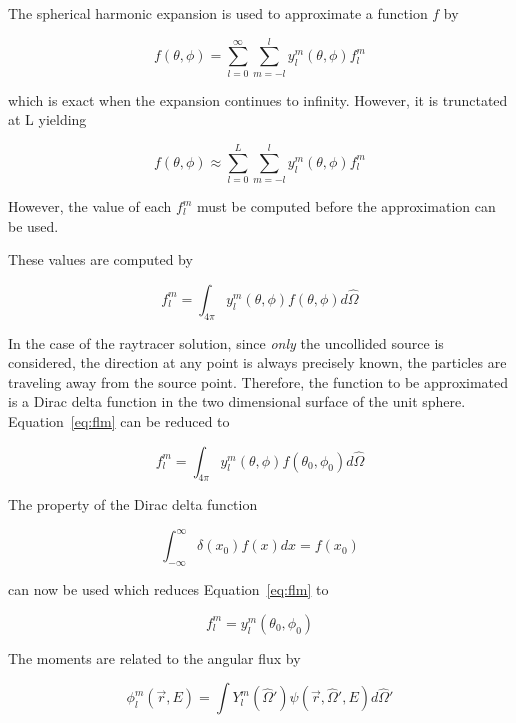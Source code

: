 \documentclass{article}
\numberwithin{equation}{subsection}
\begin{document}
The spherical harmonic expansion is used to approximate a function $f$ by 

\begin{equation}
f(\theta, \phi) = \sum_{l=0}^\infty \sum_{m=-l}^l y_l^m(\theta, \phi) f_l^m
\end{equation}

which is exact when the expansion continues to infinity. However, it is trunctated at L yielding

\begin{equation}
f(\theta, \phi) \approx \sum_{l=0}^L \sum_{m=-l}^l y_l^m(\theta, \phi) f_l^m
\end{equation}

However, the value of each $f_l^m$ must be computed before the approximation can be used.

These values are computed by

\begin{equation}\label{eq:flm}
f_l^m = \int_{4 \pi} y_l^m(\theta, \phi) f(\theta, \phi) d\hat{\Omega}
\end{equation}

In the case of the raytracer solution, since \textit{only} the uncollided source is considered, the direction at any point is always precisely known, the particles are traveling away from the source point. Therefore, the function to be approximated is a Dirac delta function in the two dimensional surface of the unit sphere. Equation~\ref{eq:flm} can be reduced to

\begin{equation}
f_l^m = \int_{4 \pi} y_l^m(\theta, \phi)f(\theta_0, \phi_0) d\hat{\Omega}
\end{equation}

The property of the Dirac delta function 

\begin{equation}
\int_{-\infty}^{\infty} \delta(x_0) f(x) dx = f(x_0)
\end{equation}

can now be used which reduces Equation~\ref{eq:flm} to

\begin{equation}
f_l^m = y_l^m(\theta_0, \phi_0)
\end{equation}

The moments are related to the angular flux by

\begin{equation}
\phi_l^m(\vec{r}, E) = \int Y_l^m(\hat{\Omega} ') \psi(\vec{r}, \hat{\Omega}', E) d\hat{\Omega}'
\end{equation}
\end{document}

